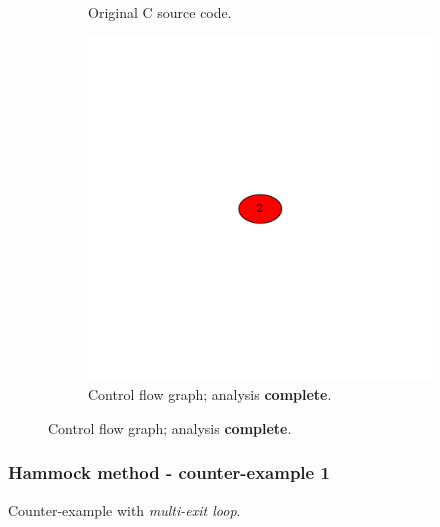 \begin{figure}[htbp]
	\centering
	\begin{subfigure}[b]{0.48\textwidth}
		\centering
		
		\caption{Original C source code.}
	\end{subfigure}
	\begin{subfigure}[b]{0.50\textwidth}
		\centering
		\includegraphics[width=\textwidth]{inc/appendices/examples/hammock/example/without-break/main_0004b.png}
		\caption{Control flow graph; analysis \textbf{complete}.}
	\end{subfigure}
\end{figure}


\clearpage

\subsubsection{Hammock method - counter-example 1}

Counter-example with \textit{multi-exit loop}.

